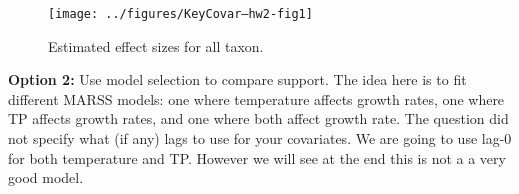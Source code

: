 \begin{figure}[htp]
\label{fig.q2a}
\begin{center}
\begin{Schunk}
\end{Schunk}
\texttt{[image: ../figures/KeyCovar--hw2-fig1]}
\end{center}
\caption{Estimated effect sizes for all taxon.}
\end{figure}

\bigskip
{\bf Option 2:}  Use model selection to compare support.  The idea here is to fit different MARSS models: one where temperature affects growth rates, one where TP affects growth rates, and one where both affect growth rate.  The question did not specify what (if any) lags to use for your covariates.  We are going to use lag-0 for both temperature and TP.  However we will see at the end this is not a a very good model.


